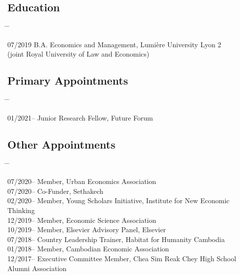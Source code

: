 \documentclass[10pt,a4paper]{article}
\newcommand{\tabbedblock}[1]{

	\begin{tabbing}
		\hspace{3cm} \= \hspace{4cm} \= \kill
		#1
	\end{tabbing}
}
\begin{document}
\subsection*{Education}

\tabbedblock{
	07/2019 \> B.A. Economics and Management, Lumière University Lyon 2\\
	\>(joint Royal University of Law and Economics)
}

\subsection*{Primary Appointments}	

\tabbedblock{
	01/2021-- \> Junior Research Fellow, Future Forum
}
	
\subsection*{Other Appointments}

\tabbedblock{
	07/2020-- \> Member, Urban Economics Association\\

	07/2020-- \> Co-Funder, Sethakech\\

	02/2020-- \> Member, Young Scholars Initiative, Institute for New Economic Thinking\\

	12/2019-- \> Member, Economic Science Association\\

	10/2019-- \> Member, Elsevier Advisory Panel, Elsevier\\

	07/2018-- \> Country Leadership Trainer, Habitat for Humanity Cambodia\\

	01/2018-- \> Member, Cambodian Economic Association\\

	12/2017-- \> Executive Committee Member, Chea Sim Reak Chey High School Alumni Association
}
	
\end{document}
